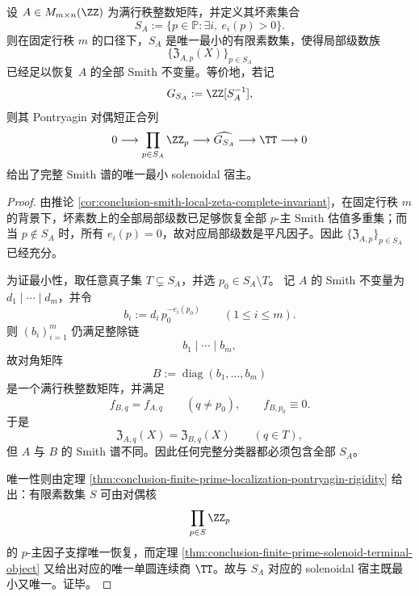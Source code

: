 \begin{theorem}\label{thm:conclusion-smith-minimal-solenoidal-host-by-bad-primes}
设 \(A\in M_{m\times n}(\ZZ)\) 为满行秩整数矩阵，并定义其坏素集合
\[
S_A:=\{p\in\mathbb P:\exists i,\ e_i(p)>0\}.
\]
则在固定行秩 \(m\) 的口径下，\(S_A\) 是唯一最小的有限素数集，使得局部级数族
\[
\{\mathfrak Z_{A,p}(X)\}_{p\in S_A}
\]
已经足以恢复 \(A\) 的全部 Smith 不变量。等价地，若记
\[
G_{S_A}:=\ZZ[S_A^{-1}],
\]
则其 Pontryagin 对偶短正合列
\[
0\longrightarrow \prod_{p\in S_A}\ZZ_p
\longrightarrow \widehat{G_{S_A}}
\longrightarrow \TT
\longrightarrow 0
\]
给出了完整 Smith 谱的唯一最小 solenoidal 宿主。
\end{theorem}
\begin{proof}
由推论 \ref{cor:conclusion-smith-local-zeta-complete-invariant}，在固定行秩 \(m\) 的背景下，坏素数上的全部局部级数已足够恢复全部 \(p\)-主 Smith 估值多重集；而当 \(p\notin S_A\) 时，所有 \(e_i(p)=0\)，故对应局部级数是平凡因子。因此 \(\{\mathfrak Z_{A,p}\}_{p\in S_A}\) 已经充分。

为证最小性，取任意真子集 \(T\subsetneq S_A\)，并选 \(p_0\in S_A\setminus T\)。
记 \(A\) 的 Smith 不变量为 \(d_1\mid\cdots\mid d_m\)，并令
\[
b_i:=d_i\,p_0^{-e_i(p_0)}
\qquad(1\le i\le m).
\]
则 \((b_i)_{i=1}^{m}\) 仍满足整除链
\[
b_1\mid\cdots\mid b_m,
\]
故对角矩阵
\[
B:=\operatorname{diag}(b_1,\dots,b_m)
\]
是一个满行秩整数矩阵，并满足
\[
f_{B,q}=f_{A,q}\qquad(q\neq p_0),
\qquad
f_{B,p_0}\equiv 0.
\]
于是
\[
\mathfrak Z_{A,q}(X)=\mathfrak Z_{B,q}(X)
\qquad(q\in T),
\]
但 \(A\) 与 \(B\) 的 Smith 谱不同。因此任何完整分类器都必须包含全部 \(S_A\)。

唯一性则由定理 \ref{thm:conclusion-finite-prime-localization-pontryagin-rigidity} 给出：有限素数集 \(S\) 可由对偶核
\[
\prod_{p\in S}\ZZ_p
\]
的 \(p\)-主因子支撑唯一恢复，而定理 \ref{thm:conclusion-finite-prime-solenoid-terminal-object} 又给出对应的唯一单圆连续商 \(\TT\)。故与 \(S_A\) 对应的 solenoidal 宿主既最小又唯一。证毕。
\end{proof}

